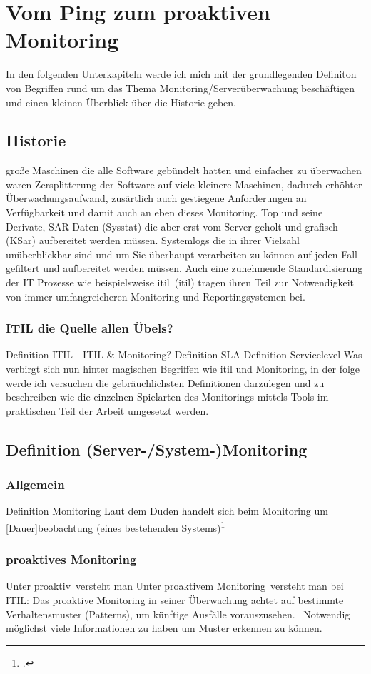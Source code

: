 \documentclass[12pt,a4paper,parskip]{scrreprt}
\begin{document}
	\chapter{Vom Ping zum proaktiven Monitoring}
	In den folgenden Unterkapiteln werde ich mich mit der grundlegenden Definiton von Begriffen rund um das Thema Monitoring/Serverüberwachung beschäftigen und einen kleinen Überblick über die Historie geben.
	\section{Historie}
	große Maschinen die alle Software gebündelt hatten und einfacher zu überwachen waren
	Zersplitterung der Software auf viele kleinere Maschinen, dadurch erhöhter Überwachungsaufwand, zusärtlich auch gestiegene Anforderungen an Verfügbarkeit und damit auch an eben dieses Monitoring.
	Top und seine Derivate, SAR Daten (Sysstat) die aber erst vom Server geholt und grafisch (KSar) aufbereitet werden müssen. Systemlogs die in ihrer Vielzahl unüberblickbar sind und um Sie überhaupt verarbeiten zu können auf jeden Fall gefiltert und aufbereitet werden müssen. Auch eine zunehmende Standardisierung der IT Prozesse wie beispielsweise \gls{itil}\ (\glsdesc{itil}) tragen ihren Teil zur Notwendigkeit von immer umfangreicheren Monitoring und Reportingsystemen bei.
	\subsection{ITIL die Quelle allen Übels?}
	Definition ITIL - ITIL \& Monitoring?
	Definition SLA
	Definition Servicelevel
	Was verbirgt sich nun hinter magischen Begriffen wie \gls{itil} und Monitoring, in der folge werde ich versuchen die gebräuchlichsten Definitionen darzulegen und zu beschreiben wie die einzelnen Spielarten des Monitorings mittels Tools im praktischen Teil der Arbeit umgesetzt werden.
	\section{Definition (Server-/System-)Monitoring}
	\subsection{Allgemein}
	Definition Monitoring
	Laut dem Duden handelt sich beim Monitoring um [Dauer]beobachtung (eines bestehenden Systems)\footcite[701; Stichwort Monitoring]{duden} 
	\subsection{proaktives Monitoring}
	Unter \glqq proaktiv\grqq\ versteht man 
	Unter \glqq proaktivem Monitoring\grqq\ versteht man bei ITIL: \glqq Das proaktive Monitoring in seiner Überwachung achtet auf bestimmte Verhaltensmuster (Patterns), um künftige Ausfälle vorauszusehen. \grqq\ 
	Notwendig möglichst viele Informationen zu haben um Muster erkennen zu können.
\end{document}
